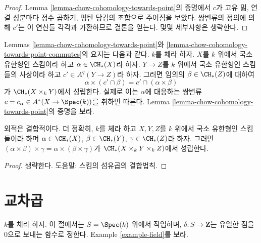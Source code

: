 \begin{proof}
Lemma \ref{lemma-chow-cohomology-towards-point}의 증명에서 $c$가
고유 밂, 연결 성분마다 정수 곱하기, 평탄 당김의 조합으로 주어짐을
보았다. 쌍변류의 정의에 의해 $c'$는 이 연산들 각각과 가환하므로
결론을 얻는다. 몇몇 세부사항은 생략한다.
\end{proof}

\begin{remark}
\label{remark-commuting-exterior}
Lemmas \ref{lemma-chow-cohomology-towards-point}와
\ref{lemma-chow-cohomology-towards-point-commutes}의 요지는 다음과 같다.
$k$를 체라 하자. $X$를 $k$ 위에서 국소 유한형인 스킴이라 하고
$\alpha \in \CH_*(X)$라 하자. $Y \to Z$를 $k$ 위에서 국소 유한형인
스킴들의 사상이라 하고 $c' \in A^q(Y \to Z)$라 하자. 그러면 임의의
$\beta \in \CH_*(Z)$에 대하여
$$
\alpha \times (c' \cap \beta) = c' \cap (\alpha \times \beta)
$$
가 $\CH_*(X \times_k Y)$에서 성립한다. 실제로 이는 $\alpha$에
대응하는 쌍변류 $c = c_\alpha \in A^*(X \to \Spec(k))$를 취하면
따른다. Lemma \ref{lemma-chow-cohomology-towards-point}의 증명을 보라.
\end{remark}

\begin{lemma}
\label{lemma-exterior-product-associative}
외적은 결합적이다. 더 정확히, $k$를 체라 하고 $X, Y, Z$를 $k$ 위에서
국소 유한형인 스킴들이라 하며
$\alpha \in \CH_*(X)$, $\beta \in \CH_*(Y)$,
$\gamma \in \CH_*(Z)$라 하자. 그러면
$(\alpha \times \beta) \times \gamma =
\alpha \times (\beta \times \gamma)$가
$\CH_*(X \times_k Y \times_k Z)$에서 성립한다.
\end{lemma}

\begin{proof}
생략한다. 도움말: 스킴의 섬유곱의 결합법칙.
\end{proof}







\section{교차곱}
\label{section-intersection-product}

\noindent
$k$를 체라 하자. 이 절에서는 $S = \Spec(k)$ 위에서 작업하며,
$\delta : S \to \mathbf{Z}$는 유일한 점을 $0$으로 보내는 함수로 정한다.
Example \ref{example-field}를 보라.

